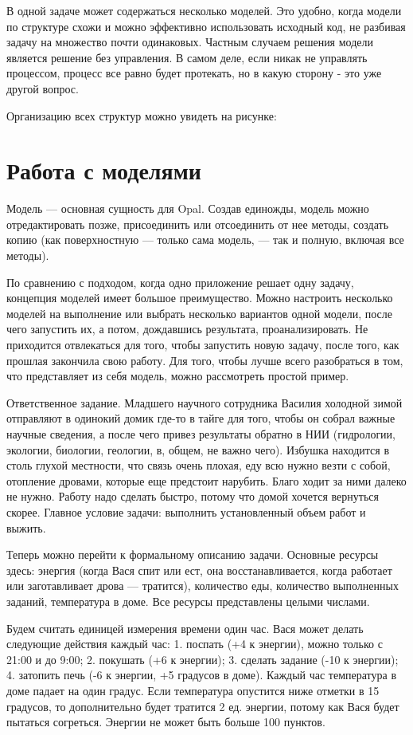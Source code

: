 В одной задаче может содержаться несколько моделей. Это удобно, когда модели по структуре схожи и можно эффективно использовать исходный код, не разбивая задачу на множество почти одинаковых. Частным случаем решения модели является решение без управления. В самом деле, если никак не управлять процессом, процесс все равно будет протекать, но в какую сторону - это уже другой вопрос.

Организацию всех структур можно увидеть на рисунке:

\section{Работа с моделями}

Модель — основная сущность для Opal. Создав единожды, модель можно отредактировать позже, присоединить или отсоединить от нее методы, создать копию (как поверхностную — только сама модель, — так и полную, включая все методы).

По сравнению с подходом, когда одно приложение решает одну задачу, концепция моделей имеет большое преимущество. Можно настроить несколько моделей на выполнение или выбрать несколько вариантов одной модели, после чего запустить их, а потом, дождавшись результата, проанализировать. Не приходится отвлекаться для того, чтобы запустить новую задачу, после того, как прошлая закончила свою работу.
Для того, чтобы лучше всего разобраться в том, что представляет из себя модель, можно рассмотреть простой пример.

Ответственное задание. Младшего научного сотрудника Василия холодной зимой отправляют в одинокий домик где-то в тайге для того, чтобы он собрал важные научные сведения, а после чего привез результаты обратно в НИИ (гидрологии, экологии, биологии, геологии, в, общем, не важно чего). Избушка находится в столь глухой местности, что связь очень плохая, еду всю нужно везти с собой, отопление дровами, которые еще предстоит нарубить. Благо ходит за ними далеко не нужно. Работу надо сделать быстро, потому что домой хочется вернуться скорее. Главное условие задачи: выполнить установленный объем работ и выжить.

Теперь можно перейти к формальному описанию задачи. Основные ресурсы здесь: энергия (когда Вася спит или ест, она восстанавливается, когда работает или заготавливает дрова — тратится), количество еды, количество выполненных заданий, температура в доме. Все ресурсы представлены целыми числами. 

Будем считать единицей измерения времени один час. Вася может делать следующие действия каждый час:
1. поспать (+4 к энергии), можно только с 21:00 и до 9:00;
2. покушать (+6 к энергии);
3. сделать задание (-10 к энергии);
4. затопить печь (-6 к энергии, +5 градусов в доме).
Каждый час температура в доме падает на один градус. Если температура опустится ниже отметки в 15 градусов, то дополнительно будет тратится 2 ед. энергии, потому как Вася будет пытаться согреться. Энергии не может быть больше 100 пунктов.

